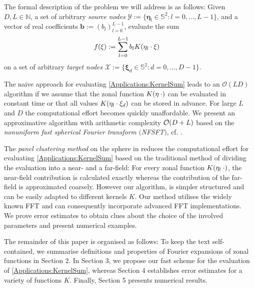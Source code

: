 \documentclass[11pt,a4paper,twoside,bibtotoc]{scrartcl}
\theoremstyle{plain}
\theoremstyle{definition}
\theoremstyle{remark}
\newcommand{\N}{\ensuremath{\mathbb{N}}}
\newcommand{\fun}[2]{\ensuremath{#1{\hspace{-0.4ex}}\left(#2\right)}}
\numberwithin{equation}{section}
\numberwithin{table}{section}
\numberwithin{figure}{section}
\begin{document}
The formal description of the problem we will address is as follows:
Given $D,L \in \N$, a set of arbitrary \emph{source nodes} $\mathcal{Y} :=
\{\mathbf{\eta}_{l} \in \mathbb{S}^2: l = 0,\ldots,L-1\}$, and a vector of
real coefficients $\mathbf{b}:=(b_{l})_{l=0}^{L-1}$, evaluate the sum
\begin{equation}
  \label{Applications:KernelSum}
  \fun{f}{\mathbf{\xi}} := \sum_{l = 0}^{L-1} b_{l} \fun{K}{\mathbf{\eta}_{l} \cdot \mathbf{\xi}}
\end{equation}
on a set of arbitrary \emph{target nodes} $\mathcal{X} := \{\mathbf{\xi}_{d}
  \in \mathbb{S}^2: d=0,\ldots,D-1\}$.

The naive approach for evaluating \eqref{Applications:KernelSum} leads to
an $\mathcal{O}\left(LD\right)$ algorithm if we assume that the zonal function
$\fun{K}{\mathbf{\eta} \: \cdot}$ can be evaluated in constant time or that all values
$\fun{K}{\mathbf{\eta}_{l} \cdot \mathbf{\xi}_{d}}$ can be stored in advance. 
For large $L$ and $D$ the computational effort becomes quickly unaffordable.
We present an approximative algorithm with arithmetic complexity 
${\cal O} (D+L)$ based on the \emph{nonuniform fast spherical Fourier 
transform $($NFSFT$)$}, cf. \cite{kupo02,keiner05}. 

The \emph{panel clustering method} on the sphere in \cite{FrGlSch98}
reduces the 
computational effort for evaluating \eqref{Applications:KernelSum} based on the
traditional method of dividing the evaluation into a near- and a far-field:
For every zonal function $\fun{K}{\mathbf{\eta}_l \: \cdot}$, the near-field
contribution is calculated exactly whereas the contribution of the far-field
is approximated coarsely. However our  algorithm, is simpler structured 
and can be easily adapted to different kernels $K$.
Our method utilises the widely known FFT and can consequently incorporate
advanced FFT implementations.
We prove error estimates to obtain clues about the choice of the
involved parameters and present numerical examples.

The remainder of this paper is organised as follows:
To keep the text self-contained, we summarise definitions and properties
of Fourier expansions of zonal functions in Section 2.
In Section 3, we propose our fast scheme for the evaluation of
\eqref{Applications:KernelSum}, whereas Section 4 establishes
error estimates for a variety of functions $K$.
Finally, Section 5 presents numerical results.

\end{document}

